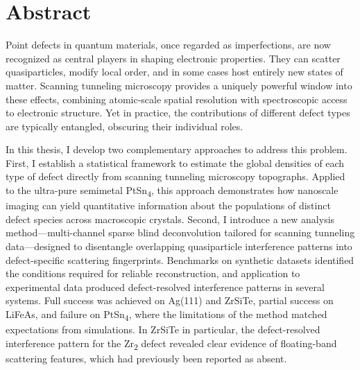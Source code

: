 
\chapter{Abstract}

Point defects in quantum materials, once regarded as imperfections, are now recognized as central players in shaping electronic properties. They can scatter quasiparticles, modify local order, and in some cases host entirely new states of matter. Scanning tunneling microscopy provides a uniquely powerful window into these effects, combining atomic-scale spatial resolution with spectroscopic access to electronic structure. Yet in practice, the contributions of different defect types are typically entangled, obscuring their individual roles.

In this thesis, I develop two complementary approaches to address this problem. First, I establish a statistical framework to estimate the global densities of each type of defect directly from scanning tunneling microscopy topographs. Applied to the ultra-pure semimetal PtSn\textsubscript{4}, this approach demonstrates how nanoscale imaging can yield quantitative information about the populations of distinct defect species across macroscopic crystals. Second, I introduce a new analysis method—multi-channel sparse blind deconvolution tailored for scanning tunneling data—designed to disentangle overlapping quasiparticle interference patterns into defect-specific scattering fingerprints. Benchmarks on synthetic datasets identified the conditions required for reliable reconstruction, and application to experimental data produced defect-resolved interference patterns in several systems. Full success was achieved on Ag(111) and ZrSiTe, partial success on LiFeAs, and failure on PtSn\textsubscript{4}, where the limitations of the method matched expectations from simulations. In ZrSiTe in particular, the defect-resolved interference pattern for the Zr\textsubscript{2} defect revealed clear evidence of floating-band scattering features, which had previously been reported as absent.


